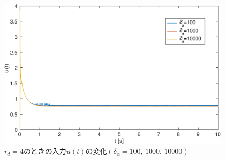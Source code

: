 \documentclass[a4paper,12pt]{jarticle}
\begin{document}
\begin{figure}[H]
 \begin{center}
  \includegraphics[scale=0.5]{../figure/eps/estimate/1/u.eps}
  \caption{$ r_d = 4 $のときの入力$ u(t) $の変化$(\delta_{\alpha} = 100, ~ 1000, ~ 10000 )$}
  \label{ua1}
 \end{center}
\end{figure}
\end{document}
